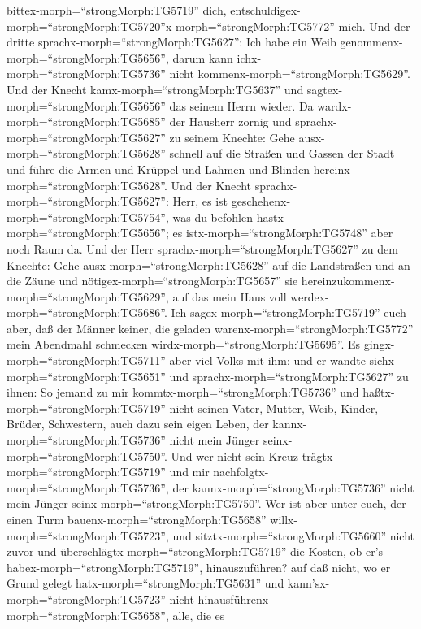 bittex-morph=``strongMorph:TG5719'' dich,
entschuldigex-morph=``strongMorph:TG5720''x-morph=``strongMorph:TG5772''
mich.  Und der dritte sprachx-morph=``strongMorph:TG5627'':
Ich habe ein Weib genommenx-morph=``strongMorph:TG5656'', darum kann
ichx-morph=``strongMorph:TG5736'' nicht
kommenx-morph=``strongMorph:TG5629''.  Und der Knecht
kamx-morph=``strongMorph:TG5637'' und
sagtex-morph=``strongMorph:TG5656'' das seinem Herrn wieder. Da
wardx-morph=``strongMorph:TG5685'' der Hausherr zornig und
sprachx-morph=``strongMorph:TG5627'' zu seinem Knechte: Gehe
ausx-morph=``strongMorph:TG5628'' schnell auf die Straßen und Gassen der
Stadt und führe die Armen und Krüppel und Lahmen und Blinden
hereinx-morph=``strongMorph:TG5628''.  Und der Knecht
sprachx-morph=``strongMorph:TG5627'': Herr, es ist
geschehenx-morph=``strongMorph:TG5754'', was du befohlen
hastx-morph=``strongMorph:TG5656''; es istx-morph=``strongMorph:TG5748''
aber noch Raum da.  Und der Herr
sprachx-morph=``strongMorph:TG5627'' zu dem Knechte: Gehe
ausx-morph=``strongMorph:TG5628'' auf die Landstraßen und an die Zäune
und nötigex-morph=``strongMorph:TG5657'' sie
hereinzukommenx-morph=``strongMorph:TG5629'', auf das mein Haus voll
werdex-morph=``strongMorph:TG5686''.  Ich
sagex-morph=``strongMorph:TG5719'' euch aber, daß der Männer keiner, die
geladen warenx-morph=``strongMorph:TG5772'' mein Abendmahl schmecken
wirdx-morph=``strongMorph:TG5695''.  Es
gingx-morph=``strongMorph:TG5711'' aber viel Volks mit ihm; und er
wandte sichx-morph=``strongMorph:TG5651'' und
sprachx-morph=``strongMorph:TG5627'' zu ihnen:  So jemand
zu mir kommtx-morph=``strongMorph:TG5736'' und
haßtx-morph=``strongMorph:TG5719'' nicht seinen Vater, Mutter, Weib,
Kinder, Brüder, Schwestern, auch dazu sein eigen Leben, der
kannx-morph=``strongMorph:TG5736'' nicht mein Jünger
seinx-morph=``strongMorph:TG5750''.  Und wer nicht sein
Kreuz trägtx-morph=``strongMorph:TG5719'' und mir
nachfolgtx-morph=``strongMorph:TG5736'', der
kannx-morph=``strongMorph:TG5736'' nicht mein Jünger
seinx-morph=``strongMorph:TG5750''.  Wer ist aber unter
euch, der einen Turm bauenx-morph=``strongMorph:TG5658''
willx-morph=``strongMorph:TG5723'', und
sitztx-morph=``strongMorph:TG5660'' nicht zuvor und
überschlägtx-morph=``strongMorph:TG5719'' die Kosten, ob er's
habex-morph=``strongMorph:TG5719'', hinauszuführen?  auf
daß nicht, wo er Grund gelegt hatx-morph=``strongMorph:TG5631'' und
kann'sx-morph=``strongMorph:TG5723'' nicht
hinausführenx-morph=``strongMorph:TG5658'', alle, die es
